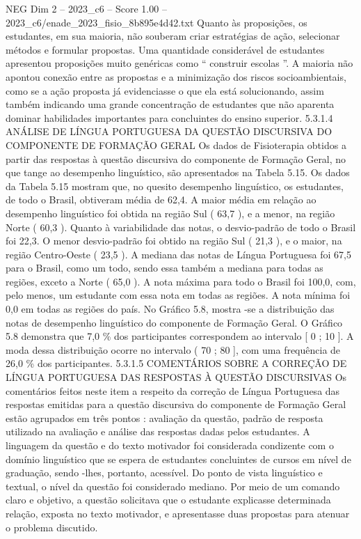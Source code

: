 \begin{textsample}{NEG Dim 2 – 2023\_c6 – Score 1.00 – 2023\_c6/enade\_2023\_fisio\_8b895e4d42.txt}
Quanto às proposições, os estudantes, em sua maioria, não souberam criar estratégias de ação, selecionar métodos e formular propostas.
Uma quantidade considerável de estudantes apresentou proposições muito genéricas como “ construir escolas ”.
A maioria não apontou conexão entre as propostas e a minimização dos riscos socioambientais, como se a ação proposta já evidenciasse o que ela está solucionando, assim também indicando uma grande concentração de estudantes que não aparenta dominar habilidades importantes para concluintes do ensino superior. 5.3.1.4 ANÁLISE DE LÍNGUA PORTUGUESA DA QUESTÃO DISCURSIVA DO COMPONENTE DE FORMAÇÃO GERAL Os dados de Fisioterapia obtidos a partir das respostas à questão discursiva do componente de Formação Geral, no que tange ao desempenho linguístico, são apresentados na Tabela 5.15.
Os dados da Tabela 5.15 mostram que, no quesito desempenho linguístico, os estudantes, de todo o Brasil, obtiveram média de 62,4.
A maior média em relação ao desempenho linguístico foi obtida na região Sul ( 63,7 ), e a menor, na região Norte ( 60,3 ).
Quanto à variabilidade das notas, o desvio-padrão de todo o Brasil foi 22,3.
O menor desvio-padrão foi obtido na região Sul ( 21,3 ), e o maior, na região Centro-Oeste ( 23,5 ).
A mediana das notas de Língua Portuguesa foi 67,5 para o Brasil, como um todo, sendo essa também a mediana para todas as regiões, exceto a Norte ( 65,0 ).
A nota máxima para todo o Brasil foi 100,0, com, pelo menos, um estudante com essa nota em todas as regiões.
A nota mínima foi 0,0 em todas as regiões do país.
No Gráfico 5.8, mostra -se a distribuição das notas de desempenho linguístico do componente de Formação Geral.
O Gráfico 5.8 demonstra que 7,0 \% dos participantes correspondem ao intervalo [ 0 ; 10 ].
A moda dessa distribuição ocorre no intervalo ( 70 ; 80 ], com uma frequência de 26,0 \% dos participantes. 5.3.1.5 COMENTÁRIOS SOBRE A CORREÇÃO DE LÍNGUA PORTUGUESA DAS RESPOSTAS À QUESTÃO DISCURSIVAS Os comentários feitos neste item a respeito da correção de Língua Portuguesa das respostas emitidas para a questão discursiva do componente de Formação Geral estão agrupados em três pontos : avaliação da questão, padrão de resposta utilizado na avaliação e análise das respostas dadas pelos estudantes.
A linguagem da questão e do texto motivador foi considerada condizente com o domínio linguístico que se espera de estudantes concluintes de cursos em nível de graduação, sendo -lhes, portanto, acessível.
Do ponto de vista linguístico e textual, o nível da questão foi considerado mediano.
Por meio de um comando claro e objetivo, a questão solicitava que o estudante explicasse determinada relação, exposta no texto motivador, e apresentasse duas propostas para atenuar o problema discutido.

\end{textsample}
